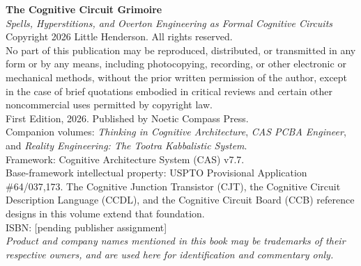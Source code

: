 \thispagestyle{empty}
\vspace*{\fill}
\begin{center}
\begin{minipage}{0.85\textwidth}
\small
\noindent
\textbf{The Cognitive Circuit Grimoire}\\
\textit{Spells, Hyperstitions, and Overton Engineering as Formal Cognitive
Circuits}\\[6pt]
Copyright \textcopyright{} 2026 Little Henderson. All rights reserved.\\[6pt]
No part of this publication may be reproduced, distributed, or transmitted in
any form or by any means, including photocopying, recording, or other electronic
or mechanical methods, without the prior written permission of the author, except
in the case of brief quotations embodied in critical reviews and certain other
noncommercial uses permitted by copyright law.\\[6pt]
First Edition, 2026. Published by Noetic Compass Press.\\[6pt]
Companion volumes: \textit{Thinking in Cognitive Architecture},
\textit{CAS PCBA Engineer}, and \textit{Reality Engineering: The Tootra
Kabbalistic System}.\\[6pt]
Framework: Cognitive Architecture System (CAS) v7.7.\\[6pt]
Base-framework intellectual property: USPTO Provisional Application
\#64/037,173. The Cognitive Junction Transistor (CJT), the Cognitive Circuit
Description Language (CCDL), and the Cognitive Circuit Board (CCB) reference
designs in this volume extend that foundation.\\[6pt]
ISBN: [pending publisher assignment]\\[6pt]
\textit{Product and company names mentioned in this book may be trademarks of
their respective owners, and are used here for identification and commentary
only.}
\end{minipage}
\end{center}
\vspace*{\fill}
\cleardoublepage

